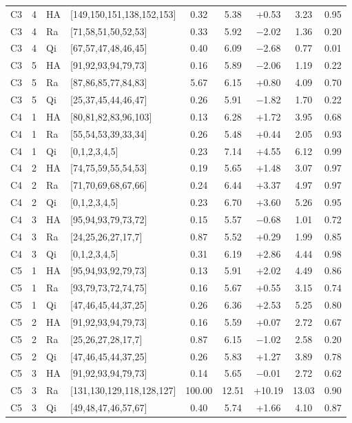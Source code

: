 \documentclass[journal]{IEEEtran}
\begin{document}
\begin{table}[t]
\begin{tabular}[t]{@{}lclp{2.75cm}ccccc@{}}
C3 & 4 & HA & [149,150,151,138,152,153] & 0.32 & 5.38 & +0.53 & 3.23 & 0.95 \\
C3 & 4 & Ra & [71,58,51,50,52,53] & 0.33 & 5.92 & $-$2.02 & 1.36 & 0.20 \\
C3 & 4 & Qi & [67,57,47,48,46,45] & 0.40 & 6.09 & $-$2.68 & 0.77 & 0.01 \\
C3 & 5 & HA & [91,92,93,94,79,73] & 0.16 & 5.89 & $-$2.06 & 1.19 & 0.22 \\
C3 & 5 & Ra & [87,86,85,77,84,83] & 5.67 & 6.15 & +0.80 & 4.09 & 0.70 \\
C3 & 5 & Qi & [25,37,45,44,46,47] & 0.26 & 5.91 & $-$1.82 & 1.70 & 0.22 \\
C4 & 1 & HA & [80,81,82,83,96,103] & 0.13 & 6.28 & +1.72 & 3.95 & 0.68 \\
C4 & 1 & Ra & [55,54,53,39,33,34] & 0.26 & 5.48 & +0.44 & 2.05 & 0.93 \\
C4 & 1 & Qi & [0,1,2,3,4,5] & 0.23 & 7.14 & +4.55 & 6.12 & 0.99 \\
C4 & 2 & HA & [74,75,59,55,54,53] & 0.19 & 5.65 & +1.48 & 3.07 & 0.97 \\
C4 & 2 & Ra & [71,70,69,68,67,66] & 0.24 & 6.44 & +3.37 & 4.97 & 0.97 \\
C4 & 2 & Qi & [0,1,2,3,4,5] & 0.23 & 6.70 & +3.60 & 5.26 & 0.95 \\
C4 & 3 & HA & [95,94,93,79,73,72] & 0.15 & 5.57 & $-$0.68 & 1.01 & 0.72 \\
C4 & 3 & Ra & [24,25,26,27,17,7] & 0.87 & 5.52 & +0.29 & 1.99 & 0.85 \\
C4 & 3 & Qi & [0,1,2,3,4,5] & 0.31 & 6.19 & +2.86 & 4.44 & 0.98 \\
C5 & 1 & HA & [95,94,93,92,79,73] & 0.13 & 5.91 & +2.02 & 4.49 & 0.86 \\
C5 & 1 & Ra & [93,79,73,72,74,75] & 0.16 & 5.67 & +0.55 & 3.15 & 0.74 \\
C5 & 1 & Qi & [47,46,45,44,37,25] & 0.26 & 6.36 & +2.53 & 5.25 & 0.80 \\
C5 & 2 & HA & [91,92,93,94,79,73] & 0.16 & 5.59 & +0.07 & 2.72 & 0.67 \\
C5 & 2 & Ra & [25,26,27,28,17,7] & 0.87 & 6.15 & $-$1.02 & 2.58 & 0.20 \\
C5 & 2 & Qi & [47,46,45,44,37,25] & 0.26 & 5.83 & +1.27 & 3.89 & 0.78 \\
C5 & 3 & HA & [91,92,93,94,79,73] & 0.14 & 5.65 & $-$0.01 & 2.72 & 0.62 \\
C5 & 3 & Ra & [131,130,129,118,128,127] & 100.00 & 12.51 & +10.19 & 13.03 & 0.90 \\
C5 & 3 & Qi & [49,48,47,46,57,67] & 0.40 & 5.74 & +1.66 & 4.10 & 0.87 \\
\bottomrule
\end{tabular}

\end{table}
\end{document}
